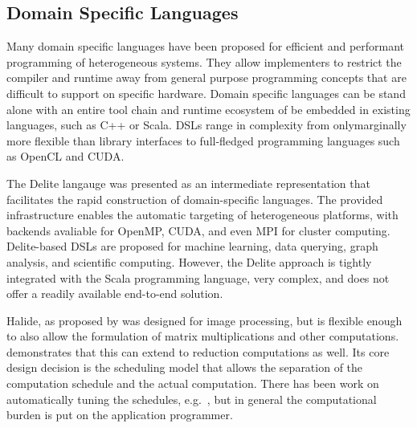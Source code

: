 \subsection{Domain Specific Languages}

    Many domain specific languages have been proposed for efficient and
    performant programming of heterogeneous systems.
    They allow implementers to restrict the compiler and runtime away from
    general purpose programming concepts that are difficult to support on
    specific hardware.
    Domain specific languages can be stand alone with an entire tool chain and
    runtime ecosystem of be embedded in existing languages, such as C++ or
    Scala.
    DSLs range in complexity from onlymarginally more flexible than library
    interfaces to full-fledged programming languages such as OpenCL and CUDA.

    The Delite langauge \citep{Sujeeth:2014:DCA:2601432.2584665} was presented
    as an intermediate representation that facilitates the rapid construction
    of domain-specific languages.
    The provided infrastructure enables the automatic targeting of
    heterogeneous platforms, with backends avaliable for OpenMP, CUDA, and even
    MPI for cluster computing.
    Delite-based DSLs are proposed for machine learning, data querying, graph
    analysis, and scientific computing.
    However, the Delite approach is tightly integrated with the Scala
    programming language, very complex, and does not offer a readily available
    end-to-end solution.

    Halide, as proposed by \citet{Ragan-Kelley:2013:HLC:2499370.2462176}
    was designed for image processing, but is flexible enough to also allow the 
    formulation of matrix multiplications and other computations.
    \citet{Suriana:2017:PAR:3049832.3049863} demonstrates that this can extend
    to reduction computations as well.
    Its core design decision is the scheduling model that allows the separation
    of the computation schedule and the actual computation.
    There has been work on automatically tuning the schedules, e.g.\ 
    \citet{Mullapudi:2016:ASH:2897824.2925952}, but in general the computational
    burden is put on the application programmer.


